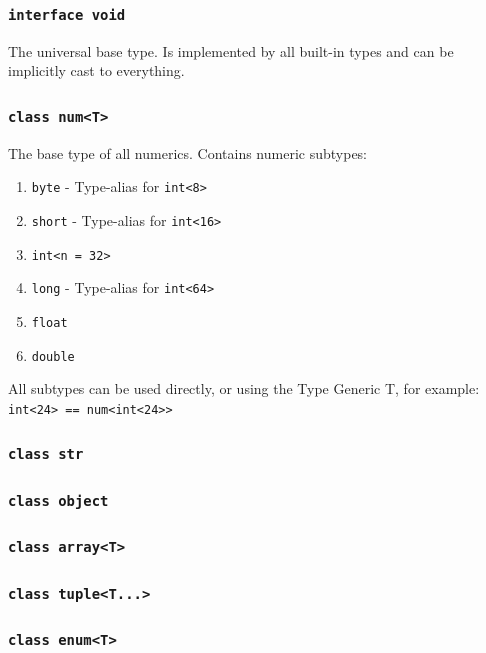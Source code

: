 \documentclass{docs}
\begin{document}
    \label{typeVoid}
    \subsubsection{\texttt{interface void}}
    The universal base type. Is implemented by all built-in types and can be implicitly cast to everything.
    
    \subsubsection{\texttt{class num<T>}}
    The base type of all numerics. Contains numeric subtypes:
    \begin{enumerate}
        \item \texttt{byte} - Type-alias for \texttt{int<8>} %
        \item \texttt{short} - Type-alias for \texttt{int<16>}
        \item \texttt{int<n = 32>}
        \item \texttt{long} - Type-alias for \texttt{int<64>}
        \item \texttt{float}
        \item \texttt{double}
    \end{enumerate}
    All subtypes can be used directly, or using the Type Generic T, for example: \texttt{int<24> == num<int<24>>}
    
    \subsubsection{\texttt{class str}}
    
    \subsubsection{\texttt{class object}}
    
    \subsubsection{\texttt{class array<T>}}
    
    \subsubsection{\texttt{class tuple<T...>}}
    
    \subsubsection{\texttt{class enum<T>}}
    
\end{document}
